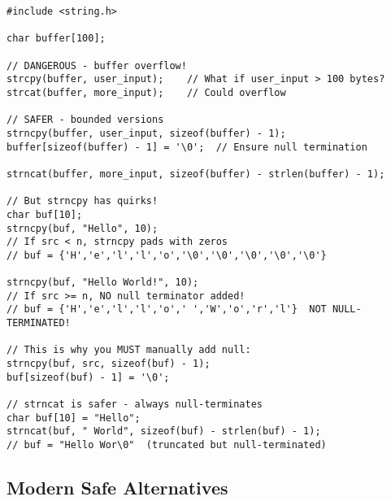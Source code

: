 \begin{lstlisting}
#include <string.h>

char buffer[100];

// DANGEROUS - buffer overflow!
strcpy(buffer, user_input);    // What if user_input > 100 bytes?
strcat(buffer, more_input);    // Could overflow

// SAFER - bounded versions
strncpy(buffer, user_input, sizeof(buffer) - 1);
buffer[sizeof(buffer) - 1] = '\0';  // Ensure null termination

strncat(buffer, more_input, sizeof(buffer) - strlen(buffer) - 1);

// But strncpy has quirks!
char buf[10];
strncpy(buf, "Hello", 10);
// If src < n, strncpy pads with zeros
// buf = {'H','e','l','l','o','\0','\0','\0','\0','\0'}

strncpy(buf, "Hello World!", 10);
// If src >= n, NO null terminator added!
// buf = {'H','e','l','l','o',' ','W','o','r','l'}  NOT NULL-TERMINATED!

// This is why you MUST manually add null:
strncpy(buf, src, sizeof(buf) - 1);
buf[sizeof(buf) - 1] = '\0';

// strncat is safer - always null-terminates
char buf[10] = "Hello";
strncat(buf, " World", sizeof(buf) - strlen(buf) - 1);
// buf = "Hello Wor\0"  (truncated but null-terminated)
\end{lstlisting}

\subsection{Modern Safe Alternatives}

